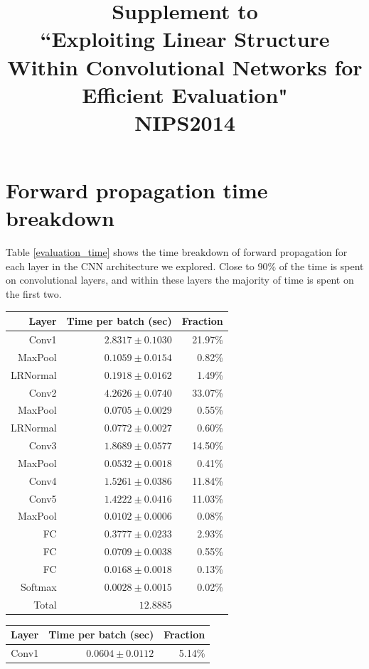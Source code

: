 \documentclass{article} %
\title{Supplement to \\
``Exploiting Linear Structure Within Convolutional Networks
  for Efficient Evaluation" \\
NIPS2014}
\begin{document}
\maketitle

\section{Forward propagation time breakdown}
Table \ref{evaluation_time} shows the time breakdown of forward propagation for each layer in the CNN architecture we explored. Close to 90\% of the time is spent on convolutional layers, and within these layers the majority of time is spent on the first two. 

\begin{table}[h]
\small
\parbox{.5\linewidth}{
\centering
\begin{tabular}{rrr}
\hline
{\bf Layer} & {\bf Time per batch (sec)} & {\bf Fraction} \\
\hline
Conv1 & $2.8317 \pm 0.1030 $ & 21.97\% \\
MaxPool & $0.1059 \pm 0.0154$ & 0.82\% \\
LRNormal & $0.1918 \pm 0.0162$ & 1.49\% \\
Conv2 & $4.2626 \pm 0.0740 $ & 33.07\% \\
MaxPool & $0.0705  \pm 0.0029$ & 0.55\% \\
LRNormal & $0.0772\pm 0.0027$ & 0.60\% \\
Conv3 & $1.8689\pm 0.0577$ & 14.50\% \\
MaxPool & $0.0532\pm 0.0018 $ & 0.41\% \\
Conv4 & $1.5261\pm 0.0386$ & 11.84\% \\
Conv5 & $1.4222\pm 0.0416$& 11.03\% \\
MaxPool & $0.0102\pm 0.0006 $ & 0.08\% \\
FC & $0.3777\pm 0.0233$ & 2.93\% \\
FC & $0.0709  \pm 0.0038$ & 0.55\% \\
FC & $0.0168 \pm 0.0018$ & 0.13\% \\
Softmax & $0.0028 \pm 0.0015$ & 0.02\%\\
\hline 
Total & $12.8885$ & \\
\hline
\end{tabular}
}
\parbox{.5\linewidth}{
\centering
\begin{tabular}{rrr}
\hline
{\bf Layer} & {\bf Time per batch (sec)} & {\bf Fraction} \\
\hline
Conv1 & $0.0604 \pm 0.0112$ & 5.14\% \\

\end{tabular}}
\end{table}
\end{document}
